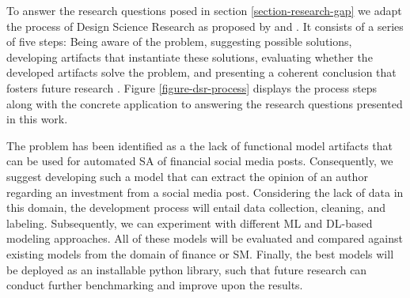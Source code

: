 To answer the research questions posed in section \ref{section-research-gap} we adapt the process of Design Science Research as proposed by  and . It consists of a series of five steps: Being aware of the problem, suggesting possible solutions, developing artifacts that instantiate these solutions, evaluating whether the developed artifacts solve the problem, and presenting a coherent conclusion that fosters future research \cite{kuechler2012dsrprocess}. Figure \ref{figure-dsr-process} displays the process steps along with the concrete application to answering the research questions presented in this work.



The problem has been identified as a the lack of functional model artifacts that can be used for automated SA of financial social media posts. Consequently, we suggest developing such a model that can extract the opinion of an author regarding an investment from a social media post. Considering the lack of data in this domain, the development process will entail data collection, cleaning, and labeling. Subsequently, we can experiment with different ML and DL-based modeling approaches. All of these models will be evaluated and compared against existing models from the domain of finance or SM. Finally, the best models will be deployed as an installable python library, such that future research can conduct further benchmarking and improve upon the results.











